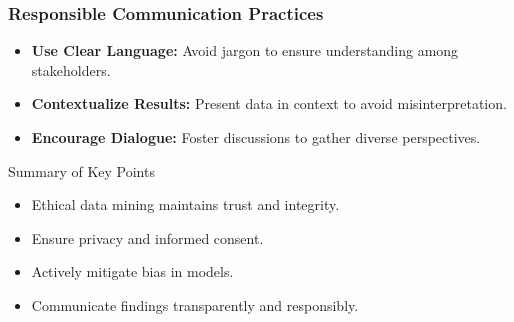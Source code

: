 \documentclass{beamer}
\begin{document}
\begin{frame}[fragile]
    \frametitle{Responsible Communication Practices}
    \begin{itemize}
        \item \textbf{Use Clear Language:} Avoid jargon to ensure understanding among stakeholders.
        \item \textbf{Contextualize Results:} Present data in context to avoid misinterpretation.
        \item \textbf{Encourage Dialogue:} Foster discussions to gather diverse perspectives.
    \end{itemize}

    \begin{block}{Summary of Key Points}
        \begin{itemize}
            \item Ethical data mining maintains trust and integrity.
            \item Ensure privacy and informed consent.
            \item Actively mitigate bias in models.
            \item Communicate findings transparently and responsibly.
        \end{itemize}
    \end{block}
\end{frame}
\end{document}
